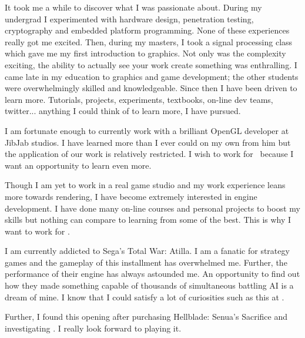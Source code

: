 It took me a while to discover what I was passionate about.
During my undergrad I experimented with hardware design, penetration testing, cryptography and embedded platform programming.
None of these experiences really got me excited.
Then, during my masters, I took a signal processing class which gave me my first introduction to graphics.
Not only was the complexity exciting, the ability to actually see your work create something was enthralling.
I came late in my education to graphics and game development; the other students were overwhelmingly skilled and knowledgeable.
Since then I have been driven to learn more.
Tutorials, projects, experiments, textbooks, on-line dev teams, twitter... anything I could think of to learn more, I have pursued.

I am fortunate enough to currently work with a brilliant OpenGL developer at JibJab studios.
I have learned more than I ever could on my own from him but the application of our work is relatively restricted.
I wish to work for \company~because I want an opportunity to learn even more.

Though I am yet to work in a real game studio and my work experience leans more towards rendering, I have become extremely interested in engine development.
I have done many on-line courses and personal projects to boost my skills but nothing can compare to learning from some of the best.
This is why I want to work for \company.

I am currently addicted to Sega's Total War: Atilla. 
I am a fanatic for strategy games and the gameplay of this installment has overwhelmed me.
Further, the performance of their engine has always astounded me. 
An opportunity to find out how they made something capable of thousands of simultaneous battling AI is a dream of mine.
I know that I could satisfy a lot of curiosities such as this at \company.

Further, I found this opening after purchasing Hellblade: Senua's Sacrifice and investigating \company.
I really look forward to playing it.